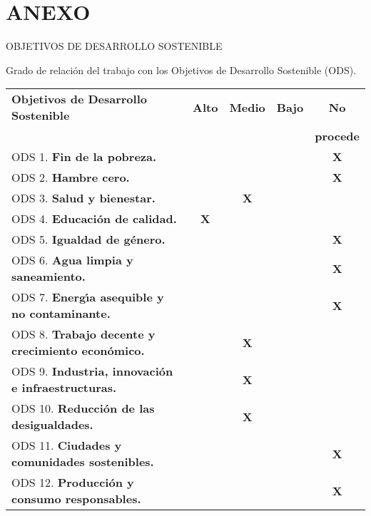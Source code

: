 \documentclass[11pt]{article}
\begin{document}
\phantom{x}

\vspace{1ex}

\section*{ANEXO}

\vspace{2ex}

OBJETIVOS DE DESARROLLO SOSTENIBLE

\vspace{4ex}

Grado de relaci\'on del trabajo con los Objetivos de Desarrollo Sostenible (ODS).

\vspace{2ex}

\begin{tabular}{|l|c|c|c|c|}\hline
\textbf{Objetivos de Desarrollo Sostenible} & \textbf{Alto} & \textbf{Medio} & \textbf{Bajo} & \textbf{No} \\
& & & & \textbf{procede} \\ \hline
ODS 1.  \textbf{Fin de la pobreza.}                            & & & & \textbf{X} \\ \hline
ODS 2.  \textbf{Hambre cero.}                                  & & & & \textbf{X} \\ \hline
ODS 3.  \textbf{Salud y bienestar.}                            & & \textbf{X} & & \\ \hline
ODS 4.  \textbf{Educaci\'on de calidad.}                       & \textbf{X} & & & \\ \hline
ODS 5.  \textbf{Igualdad de g\'enero.}                         & & & & \textbf{X} \\ \hline
ODS 6.  \textbf{Agua limpia y saneamiento.}                    & & & & \textbf{X} \\ \hline
ODS 7.  \textbf{Energ\'{\i}a asequible y no contaminante.}     & & & & \textbf{X} \\ \hline
ODS 8.  \textbf{Trabajo decente y crecimiento econ\'omico.}    & & \textbf{X} & & \\ \hline
ODS 9.  \textbf{Industria, innovaci\'on e infraestructuras.}   & & \textbf{X} & & \\ \hline
ODS 10. \textbf{Reducci\'on de las desigualdades.}             & & \textbf{X} & & \\ \hline
ODS 11. \textbf{Ciudades y comunidades sostenibles.}           & & & & \textbf{X} \\ \hline
ODS 12. \textbf{Producci\'on y consumo responsables.}          & & & & \textbf{X} \\ \hline

\end{tabular}
\end{document}
